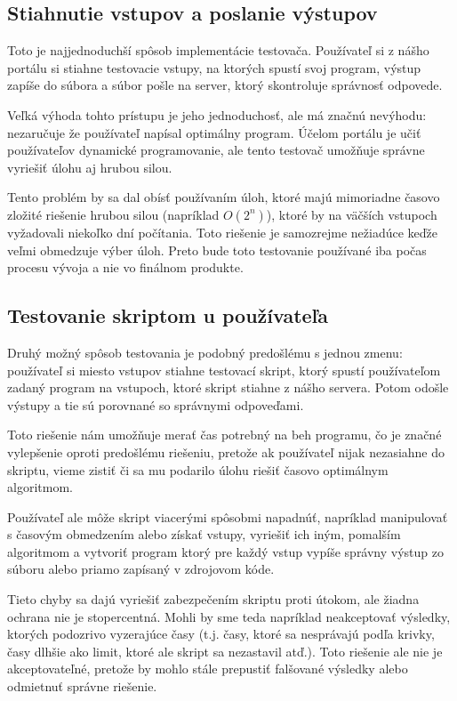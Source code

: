 \subsection{Stiahnutie vstupov a poslanie výstupov}
\label{testovac1}
Toto je najjednoduchší spôsob implementácie testovača. Používateľ si z nášho portálu si stiahne testovacie vstupy, na ktorých spustí
svoj program, výstup zapíše do súbora a súbor pošle na server, ktorý skontroluje správnosť odpovede.

 Veľká výhoda tohto prístupu je jeho jednoduchosť, ale má značnú nevýhodu: nezaručuje že používateľ napísal optimálny program.
Účelom portálu je učiť používateľov dynamické programovanie, ale tento testovač umožňuje správne vyriešiť úlohu aj hrubou silou.

Tento problém by sa dal obísť používaním úloh, ktoré majú mimoriadne časovo zložité riešenie hrubou silou (napríklad \(O(2^n)\)), ktoré by na väčších vstupoch
vyžadovali niekoľko dní počítania.
Toto riešenie je samozrejme nežiadúce keďže veľmi obmedzuje výber úloh. Preto bude toto testovanie používané iba počas procesu vývoja a nie vo finálnom produkte.

\subsection{Testovanie skriptom u používateľa}

\label{testovac2}
Druhý možný spôsob testovania je podobný predošlému s jednou zmenu: používateľ si miesto vstupov stiahne testovací skript, ktorý spustí používateľom zadaný program
na vstupoch, ktoré skript stiahne z nášho servera. Potom odošle výstupy a tie sú porovnané so správnymi odpoveďami.

Toto riešenie nám umožňuje merať čas potrebný na beh programu, čo je značné vylepšenie oproti predošlému riešeniu, pretože ak používateľ nijak nezasiahne
do skriptu, vieme zistiť či sa mu podarilo úlohu riešiť časovo optimálnym algoritmom.

Používateľ ale môže skript viacerými spôsobmi napadnúť, napríklad manipulovať s časovým obmedzením alebo získať vstupy, vyriešiť ich iným, pomalším algoritmom a
vytvoriť program ktorý pre každý vstup vypíše správny výstup zo súboru alebo priamo zapísaný v zdrojovom kóde.

Tieto chyby sa dajú vyriešiť zabezpečením skriptu proti útokom, ale žiadna ochrana nie je stopercentná. Mohli by sme teda napríklad neakceptovať výsledky, ktorých podozrivo vyzerajúce
časy (t.j. časy, ktoré sa nesprávajú podľa krivky, časy dlhšie ako limit, ktoré ale skript sa nezastavil atď.). Toto riešenie ale nie je akceptovateľné, pretože by mohlo stále prepustiť
falšované výsledky alebo odmietnuť správne riešenie.

